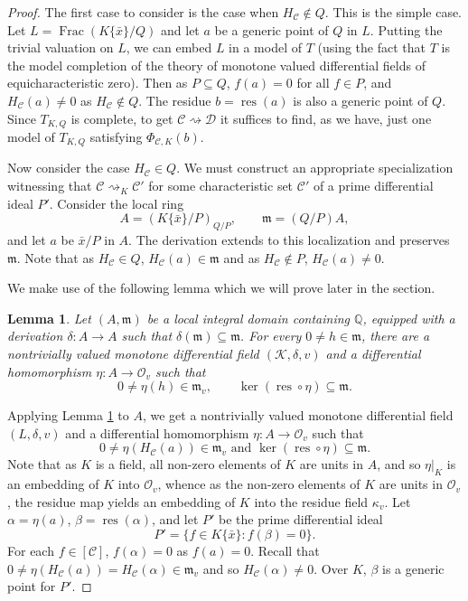 \documentclass[12pt]{amsart}
\newtheorem{lemma}[theorem]{Lemma}
\theoremstyle{definition}
\numberwithin{subcase}{cases}
\theoremstyle{remark}
\DeclareMathOperator{\res}{res}
\newcommand{\mc}[1]{\mathcal{#1}}
\DeclareMathOperator{\fractionfield}{Frac}
\begin{document}
\begin{proof}
The first case to consider is the case when $H_{\mc{C}} \notin Q$. This is the simple case. Let $L = \fractionfield(K\{\bar{x}\}/Q)$ and let $a$ be a generic point of $Q$ in $L$. Putting the trivial valuation on $L$, we can embed $L$ in a model of $T$ (using the fact that $T$ is the model completion of the theory of monotone valued differential fields of equicharacteristic zero). Then as $P \subseteq Q$, $f(a) = 0$ for all $f \in P$, and $H_\mc{C}(a) \neq 0$ as $H_{\mc{C}} \notin Q$. The residue $b = \res(a)$ is also a generic point of $Q$. Since $T_{K,Q}$ is complete, to get $\mc{C} \rightsquigarrow \mc{D}$ it suffices to find, as we have, just one model of $T_{K,Q}$ satisfying $\Phi_{\mc{C},K}(b)$.

Now consider the case $H_{\mc{C}} \in Q$. We must construct an appropriate specialization witnessing that $\mc{C} \rightsquigarrow_K \mc{C}'$ for some characteristic set $\mc{C}'$ of a prime differential ideal $P'$. Consider the local ring
\[
  A=(K\{\bar{x}\}/P)_{Q/P},\qquad \mathfrak m=(Q/P)A,
\]
and let $a$ be $\bar{x} / P$ in $A$.
The derivation extends to this localization and preserves $\mathfrak m$. Note that as $H_\mc{C} \in Q$, $H_{\mc{C}}(a) \in \mathfrak{m}$ and as $H_\mc{C} \notin P$, $H_{\mc{C}}(a) \neq 0$. 

We make use of the following lemma which we will prove later in the section. 

\begin{lemma}\label{lem:local-specialization}
Let $(A,\mathfrak m)$ be a local integral domain containing $\mathbb{Q}$,
equipped with a derivation $\delta:A\to A$ such that
$\delta(\mathfrak m)\subseteq\mathfrak m$. For every
$0\ne h\in\mathfrak m$, there are a nontrivially valued monotone
differential field $(\mathcal K,\delta,v)$ and a differential
homomorphism $\eta:A\to\mathcal O_v$ such that
\[
 0\ne\eta(h)\in\mathfrak m_v,\qquad
 \ker(\res\circ\eta)\subseteq\mathfrak m.
\]
\end{lemma}

Applying Lemma \ref{lem:local-specialization} to $A$, we get a nontrivially valued monotone differential field $(L,\delta,v)$ and a differential homomorphism $\eta : A \to \mc{O}_v$ such that
\[ 0 \neq \eta(H_{\mc{C}}(a)) \in \mathfrak{m}_v \text{ and } \ker(\res \circ \eta) \subseteq \mathfrak{m}.\]
Note that as $K$ is a field, all non-zero elements of $K$ are units in $A$, and so $\eta |_K$ is an embedding of $K$ into $\mc{O}_v$, whence as the non-zero elements of $K$ are units in $\mc{O}_v$, the residue map yields an embedding of $K$ into the residue field $\kappa_v$. Let $\alpha = \eta(a)$, $\beta = \res(\alpha)$, and let $P'$ be the prime differential ideal
\[ P' = \{ f \in K\{\bar{x}\} : f(\beta) = 0\}.\]
For each $f \in [\mc{C}]$, $f(\alpha) = 0$ as $f(a) = 0$. Recall that $0 \neq \eta(H_{\mc{C}}(a)) = H_{\mc{C}}(\alpha) \in \mathfrak{m}_v$ and so $H_{\mc{C}}(\alpha) \neq 0$. Over $K$, $\beta$ is a generic point for $P'$.


\end{proof}
\end{document}
